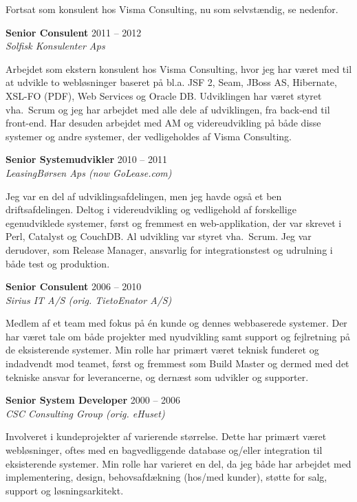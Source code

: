 \documentclass[a4paper,11pt]{article}
\begin{document}
Fortsat som konsulent hos Visma Consulting, nu som selvstændig, se
nedenfor.

\smallskip

\textbf{Senior Consulent} \hfill 2011 -- 2012 \\
\textsl{Solfisk Konsulenter Aps}

Arbejdet som ekstern konsulent hos Visma Consulting, hvor jeg har
været med til at udvikle to webløsninger baseret på bl.a. JSF 2, Seam,
JBoss AS, Hibernate, XSL-FO (PDF), Web Services og Oracle
DB. Udviklingen har været styret vha.\ Scrum og jeg har arbejdet med
alle dele af udviklingen, fra back-end til front-end.  Har desuden
arbejdet med AM og videreudvikling på både disse systemer og andre
systemer, der vedligeholdes af Visma Consulting.

\smallskip

\textbf{Senior Systemudvikler} \hfill 2010 -- 2011 \\
\textsl{LeasingBørsen Aps (now GoLease.com)}

Jeg var en del af udviklingsafdelingen, men jeg havde også et ben
driftsafdelingen. Deltog i videreudvikling og vedligehold af
forskellige egenudviklede systemer, først og fremmest en
web-applikation, der var skrevet i Perl, Catalyst og CouchDB.  Al
udvikling var styret vha.\ Scrum. Jeg var derudover, som Release
Manager, ansvarlig for integrationstest og udrulning i både test og
produktion.

\smallskip

\textbf{Senior Consulent} \hfill 2006 -- 2010 \\
\textsl{Sirius IT A/S (orig. TietoEnator A/S)}

Medlem af et team med fokus på én kunde og dennes webbaserede
systemer. Der har været tale om både projekter med nyudvikling samt
support og fejlretning på de eksisterende systemer. Min rolle har
primært været teknisk funderet og indadvendt mod teamet, først og
fremmest som Build Master og dermed med det tekniske ansvar for
leverancerne, og dernæst som udvikler og supporter.

\smallskip

\textbf{Senior System Developer} \hfill 2000 -- 2006 \\
\textsl{CSC Consulting Group (orig. eHuset)}

Involveret i kundeprojekter af varierende størrelse. Dette har primært
været webløsninger, oftes med en bagvedliggende database og/eller
integration til eksisterende systemer. Min rolle har varieret en del,
da jeg både har arbejdet med implementering, design, behovsafdækning
(hos/med kunder), støtte for salg, support og løsningsarkitekt.
\end{document}
